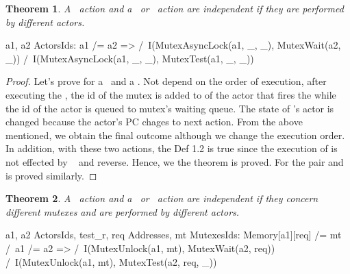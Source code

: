\documentclass[a4paper,11pt]{article}
\theoremstyle{break}
\newtheorem{theorem}{Theorem}[section]
\begin{document}
\begin{theorem}
A \mutexlock~action and a \mutexwait~or \mutextest~action are independent if they are performed by different actors.
\end{theorem}
\begin{tla}
\forall a1, a2 \in ActorsIds: a1 /= a2 =>
		/\ I(MutexAsyncLock(a1, _, _), MutexWait(a2, _))
		/\ I(MutexAsyncLock(a1, _, _), MutexTest(a1, _, _))
\end{tla}
\begin{tlatex}
%
\end{tlatex}

\begin{proof}
	Let's prove for a \mutexlock~and a \mutexwait. Not depend on the order of execution, after executing the \mutexlock, the id of the mutex is added to \request of the actor that fires the \mutexlock while the id of the actor is queued to mutex's waiting queue. The state of \mutexwait's actor is changed because the actor's PC chages to next action. From the above mentioned, we obtain the final outcome although we change the execution order. In addition, with these two actions, the Def 1.2 is true since the execution of \mutexlock is not effected by \mutexwait~ and reverse. Hence, we the theorem is proved. For the pair \mutexlock and \mutextest is proved similarly. 
\end{proof}

\begin{theorem}
	A \mutexunlock~action and a \mutexwait~or \mutextest~action are independent if they concern different mutexes and are performed by different actors.
\end{theorem}
\begin{tla}
\forall a1, a2 \in ActorsIds, test_r, req \in Addresses, mt \in MutexesIds:
Memory[a1][req] /= mt /\ a1 /= a2 =>
	    /\ I(MutexUnlock(a1, mt), MutexWait(a2, req))
	    /\ I(MutexUnlock(a1, mt), MutexTest(a2, req, _))
\end{tla}
\begin{tlatex}
%
\end{tlatex}
\end{document}
